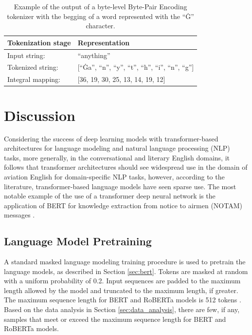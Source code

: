 \documentclass[12pt]{article}
\begin{document}
\begin{table}[!t]
    \centering
    \begin{tabular}{l l}
        \toprule
        Tokenization stage & Representation                                            \\
        \midrule
        Input string:      & ``anything''                                              \\
        Tokenized string:  & [``Ġa'', ``n'', ``y'', ``t'', ``h'', ``i'', ``n'', ``g''] \\
        Integral mapping:  & [36, 19, 30, 25, 13, 14, 19, 12]                          \\
        \bottomrule
    \end{tabular}
    \caption{Example of the output of a byte-level Byte-Pair Encoding tokenizer with the begging of a word represented with the ``Ġ'' character.}
    \label{tab:byte_level_bpe_example}
\end{table}

\section{Discussion}\label{sec:discussion}
Considering the success of deep learning models with transformer-based architectures for language modeling and natural language processing (NLP)
tasks, more generally, in the conversational and literary English domains, it follows that transformer architectures should see widespread use in the
domain of aviation English for domain-specific NLP tasks, however, according to the literature, transformer-based language models have seen sparse
use. The most notable example of the use of a transformer deep neural network is the application of BERT for knowledge extraction from notice to
airmen (NOTAM) messages \cite{arnold_knowledge_2022}.



\subsection{Language Model Pretraining}\label{sec:lm_pretraining}
A standard masked language modeling training procedure is used to pretrain the language models, as described in Section \ref{sec:bert}. Tokens are
masked at random with a uniform probability of 0.2. Input sequences are padded to the maximum length allowed by the model and truncated to the maximum
length, if greater. The maximum sequence length for BERT and RoBERTa models is 512 tokens \cite{devlin_bert_2019,liu_roberta_2019}. Based on the data
analysis in Section \ref{sec:data_analysis}, there are few, if any, samples that meet or exceed the maximum sequence length for BERT and RoBERTa
models.
\end{document}
